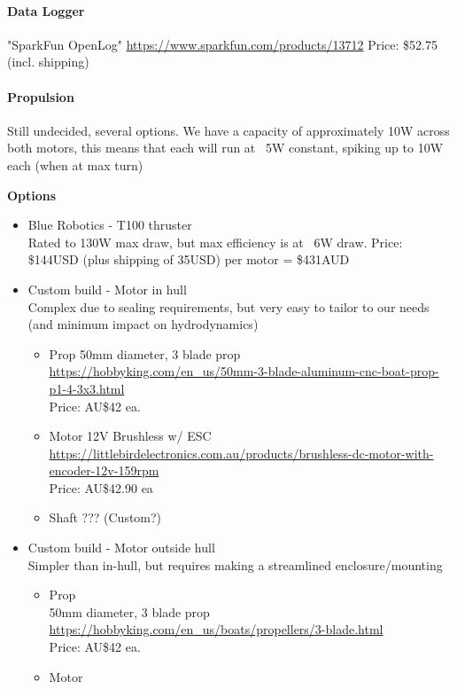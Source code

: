\paragraph{Data Logger}
"SparkFun OpenLog"
\url{https://www.sparkfun.com/products/13712}
Price: \$52.75 (incl. shipping)

\paragraph{Propulsion}
Still undecided, several options. We have a capacity of approximately 10W across both motors, this means that each will run at ~5W constant, spiking up to 10W each (when at max turn)

\textbf{Options}
\begin{itemize}
\item{Blue Robotics - T100 thruster} \\
 Rated to 130W max draw, but max efficiency is at ~6W draw.
 Price: \$144USD (plus shipping of 35USD) per motor = \$431AUD
\item{Custom build - Motor in hull} \\
 Complex due to sealing requirements, but very easy to tailor to our needs (and minimum impact on hydrodynamics)
 \begin{itemize}
 \item{Prop} 50mm diameter, 3 blade prop \\
  \url{https://hobbyking.com/en_us/50mm-3-blade-aluminum-cnc-boat-prop-p1-4-3x3.html}\\
   Price: AU\$42 ea.
 \item{Motor} 12V Brushless w/ ESC \\
  \url{https://littlebirdelectronics.com.au/products/brushless-dc-motor-with-encoder-12v-159rpm}\\
  Price: AU\$42.90 ea
 \item{Shaft} ??? (Custom?)
 \end{itemize}
\item{Custom build - Motor outside hull} \\
 Simpler than in-hull, but requires making a streamlined enclosure/mounting
 \begin{itemize}
 \item{Prop} \\
  50mm diameter, 3 blade prop \\
  \url{https://hobbyking.com/en_us/boats/propellers/3-blade.html}\\
  Price: AU\$42 ea.
 \item{Motor} \\

\end{itemize}
\end{itemize}
